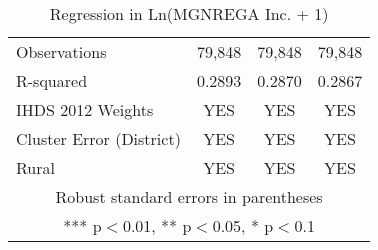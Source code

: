 \documentclass{article}
\begin{document}
\begin{landscape}
\begin{table}[]
\begin{tabular}{lccc}
 &  &  &  \\\hline
Observations & 79,848 & 79,848 & 79,848 \\
R-squared & 0.2893 & 0.2870 & 0.2867 \\ 
IHDS 2012 Weights & YES & YES & YES \\
Cluster Error (District) & YES & YES & YES \\
Rural & YES & YES & YES \\\hline
\multicolumn{4}{c}{ Robust standard errors in parentheses} \\
\multicolumn{4}{c}{ *** p$<$0.01, ** p$<$0.05, * p$<$0.1} \\\hline
\end{tabular}
    \caption{Regression in Ln(MGNREGA Inc. + 1)}
    \label{tab5}
    \end{table}
    
\end{landscape}
\end{document}
